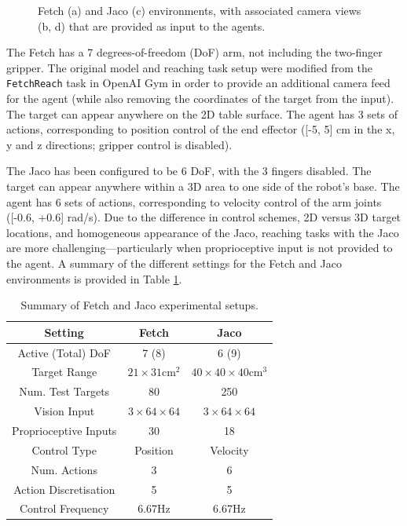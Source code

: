 \begin{figure}
\begin{subfigure}{0.49\columnwidth}
  \end{subfigure}
  \caption{Fetch (a) and Jaco (c) environments, with associated camera views (b, d) that are provided as input to the agents.}
  \label{fig:robot_setups}
\end{figure}

The Fetch has a 7 degrees-of-freedom (DoF) arm, not including the
two-finger gripper. The original model and reaching task setup were
modified from the \texttt{FetchReach} task in OpenAI Gym
\cite{brockman2016openai, plappert2018multi} in order to provide an
additional camera feed for the agent (while also removing the
coordinates of the target from the input). The target can appear
anywhere on the 2D table surface. The agent has 3 sets of actions,
corresponding to position control of the end effector ({[}-5, 5{]} cm in
the x, y and z directions; gripper control is disabled).

The Jaco has been configured to be 6 DoF, with the 3 fingers disabled.
The target can appear anywhere within a 3D area to one side of the
robot's base. The agent has 6 sets of actions, corresponding to velocity
control of the arm joints ({[}-0.6, +0.6{]} rad/s). Due to the
difference in control schemes, 2D versus 3D target locations, and
homogeneous appearance of the Jaco, reaching tasks with the Jaco are
more challenging---particularly when proprioceptive input is not
provided to the agent. A summary of the different settings for the Fetch
and Jaco environments is provided in Table \ref{tbl:exp_setup}.

\begin{table}
  \caption{Summary of Fetch and Jaco experimental setups.}
  \label{tbl:exp_setup}
  \centering
  \begin{tabular}{c|cc}
    \toprule
    Setting & Fetch & Jaco \\
    \midrule
    Active (Total) DoF & 7 (8) & 6 (9) \\
    Target Range & $21 \times 31 \text{cm}^2$ & $40 \times 40 \times 40 \text{cm}^3$ \\
    Num. Test Targets & 80 & 250 \\
    Vision Input & $3 \times 64 \times 64$ & $3 \times 64 \times 64$ \\
    Proprioceptive Inputs & 30 & 18 \\
    Control Type & Position & Velocity \\
    Num. Actions & 3 & 6 \\
    Action Discretisation & 5 & 5 \\
    Control Frequency & 6.67Hz & 6.67Hz \\
    \bottomrule
  \end{tabular}
\end{table}


